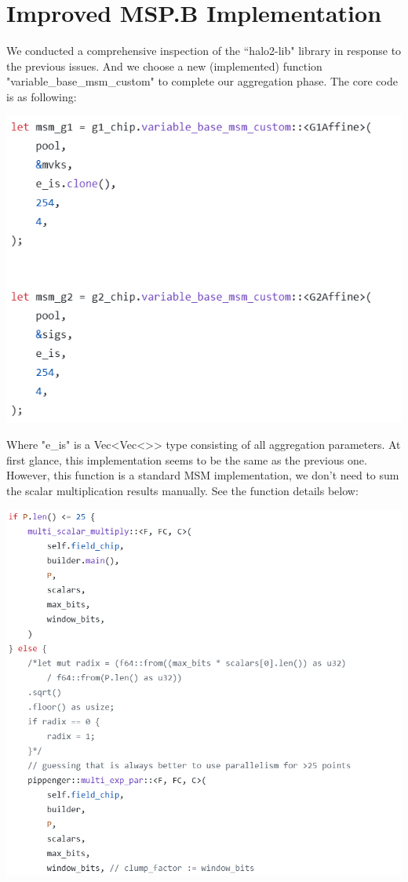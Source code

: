 \documentclass{article}
\begin{document}
\section{Improved MSP.B Implementation}

We conducted a comprehensive inspection of the “halo2-lib" library in response to the previous issues. And we choose a new (implemented) function "variable\_base\_msm\_custom" to complete our aggregation phase. The core code is as following:

\vspace{0.3cm}
\includegraphics[width=0.9\linewidth]{msp_msm_code.png}
\vspace{0.3cm}

Where "e\_is" is a Vec<Vec<>> type consisting of all aggregation parameters. At first glance, this implementation seems to be the same as the previous one. However, this function is a standard MSM implementation, we don't need to sum the scalar multiplication results manually. See the function details below:


\vspace{0.3cm}
\includegraphics[width=0.9\linewidth]{variable_base_msm_custom.png}
\vspace{0.3cm}
\end{document}
